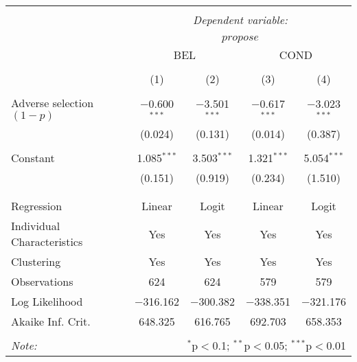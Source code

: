 
\begin{tabular}{@{\extracolsep{5pt}}lcccc} 
\\[-1.8ex]\hline 
\hline \\[-1.8ex] 
 & \multicolumn{4}{c}{\textit{Dependent variable:}} \\ 
\cline{2-5} 
\\[-1.8ex] & \multicolumn{4}{c}{$propose$} \\ 
 & \multicolumn{2}{c}{BEL} & \multicolumn{2}{c}{COND} \\ 
\\[-1.8ex] & (1) & (2) & (3) & (4)\\ 
\hline \\[-1.8ex] 
 Adverse selection $(1-p)$ & $-$0.600$^{***}$ & $-$3.501$^{***}$ & $-$0.617$^{***}$ & $-$3.023$^{***}$ \\ 
  & (0.024) & (0.131) & (0.014) & (0.387) \\ 
  & & & & \\ 
 Constant & 1.085$^{***}$ & 3.503$^{***}$ & 1.321$^{***}$ & 5.054$^{***}$ \\ 
  & (0.151) & (0.919) & (0.234) & (1.510) \\ 
  & & & & \\ 
\hline \\[-1.8ex] 
Regression & Linear & Logit & Linear & Logit \\ 
Individual Characteristics & Yes & Yes & Yes & Yes \\ 
Clustering & Yes & Yes & Yes & Yes \\ 
Observations & 624 & 624 & 579 & 579 \\ 
Log Likelihood & $-$316.162 & $-$300.382 & $-$338.351 & $-$321.176 \\ 
Akaike Inf. Crit. & 648.325 & 616.765 & 692.703 & 658.353 \\ 
\hline 
\hline \\[-1.8ex] 
\textit{Note:}  & \multicolumn{4}{r}{$^{*}$p$<$0.1; $^{**}$p$<$0.05; $^{***}$p$<$0.01} \\ 
\end{tabular} 
